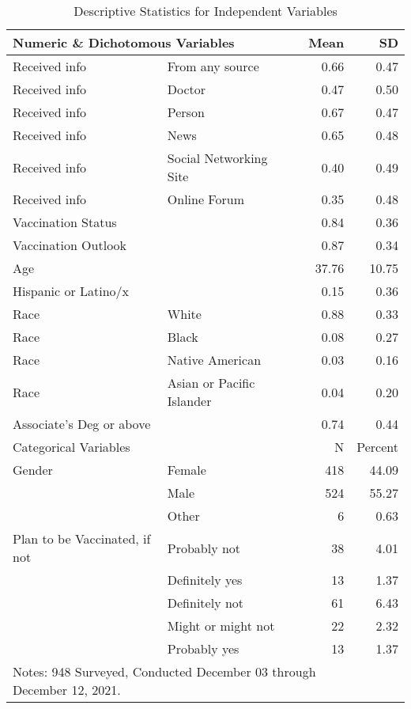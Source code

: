 \begin{table}[!ht]

\caption{\label{tab:table-2-dep}Descriptive Statistics for Independent Variables}
\centering
\fontsize{10}{12}\selectfont
\begin{tabular}{llrr}
\toprule
\multicolumn{2}{l}{Numeric \& Dichotomous Variables} & Mean & SD\\
\midrule
Received info & From any source & \num{0.66} & \num{0.47}\\
Received info & Doctor & \num{0.47} & \num{0.50}\\
Received info & Person & \num{0.67} & \num{0.47}\\
Received info & News & \num{0.65} & \num{0.48}\\
Received info & Social Networking Site & \num{0.40} & \num{0.49}\\
Received info & Online Forum & \num{0.35} & \num{0.48}\\
Vaccination Status &  &  \num{0.84} & \num{0.36}\\
Vaccination Outlook &  &  \num{0.87} & \num{0.34}\\
Age &  & \num{37.76} & \num{10.75}\\
Hispanic or Latino/x &  & \num{0.15} & \num{0.36}\\
Race & White & \num{0.88} & \num{0.33}\\
Race & Black & \num{0.08} & \num{0.27}\\
Race & Native American & \num{0.03} & \num{0.16}\\
Race & Asian or Pacific Islander & \num{0.04} & \num{0.20}\\
Associate's Deg or above &  & \num{0.74} & \num{0.44}\\\toprule
\multicolumn{2}{l}{Categorical Variables}  &  N & Percent\\\midrule
Gender & Female & 418 & \num{44.09}\\
 & Male & 524 & \num{55.27}\\
 & Other & 6 & \num{0.63}\\
Plan to be Vaccinated, if not & Probably not & 38 & \num{4.01}\\
 & Definitely yes & 13 & \num{1.37}\\
 & Definitely not & 61 & \num{6.43}\\
 & Might or might not & 22 & \num{2.32}\\
 & Probably yes & 13 & \num{1.37}\\
\bottomrule
\multicolumn{3}{l}{\rule{0pt}{1em}Notes: 948 Surveyed, Conducted December 03 through December 12, 2021.}\\
\end{tabular}
\end{table}